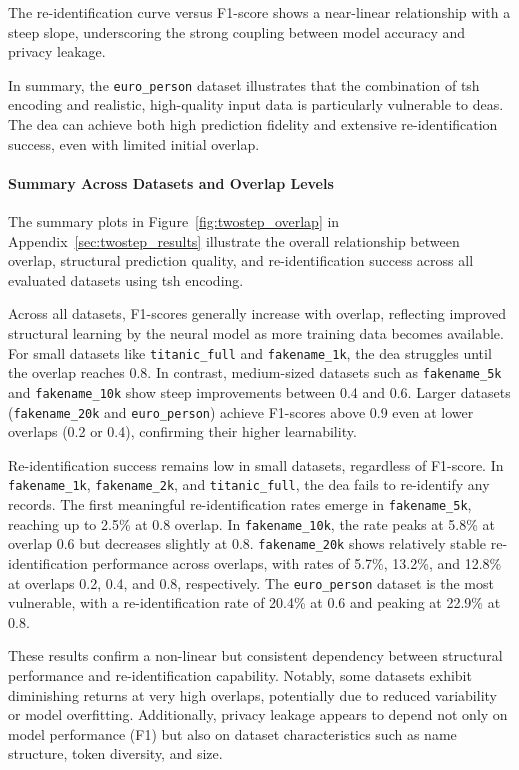 The re-identification curve versus F1-score shows a near-linear relationship with a steep slope, underscoring the strong coupling between model accuracy and privacy leakage.

In summary, the \texttt{euro\_person} dataset illustrates that the combination of \ac{tsh} encoding and realistic, high-quality input data is particularly vulnerable to \ac{dea}s.
The \ac{dea} can achieve both high prediction fidelity and extensive re-identification success, even with limited initial overlap.

\paragraph{Summary Across Datasets and Overlap Levels}

The summary plots in Figure~\ref{fig:twostep_overlap} in Appendix~\ref{sec:twostep_results} illustrate the overall relationship between overlap, structural prediction quality, and re-identification success across all evaluated datasets using \ac{tsh} encoding.

Across all datasets, F1-scores generally increase with overlap, reflecting improved structural learning by the neural model as more training data becomes available.
For small datasets like \texttt{titanic\_full} and \texttt{fakename\_1k}, the \ac{dea} struggles until the overlap reaches 0.8.
In contrast, medium-sized datasets such as \texttt{fakename\_5k} and \texttt{fakename\_10k} show steep improvements between 0.4 and 0.6.
Larger datasets (\texttt{fakename\_20k} and \texttt{euro\_person}) achieve F1-scores above 0.9 even at lower overlaps (0.2 or 0.4), confirming their higher learnability.

Re-identification success remains low in small datasets, regardless of F1-score.
In \texttt{fakename\_1k}, \texttt{fakename\_2k}, and \texttt{titanic\_full}, the \ac{dea} fails to re-identify any records.
The first meaningful re-identification rates emerge in \texttt{fakename\_5k}, reaching up to 2.5\% at 0.8 overlap.
In \texttt{fakename\_10k}, the rate peaks at 5.8\% at overlap 0.6 but decreases slightly at 0.8.
\texttt{fakename\_20k} shows relatively stable re-identification performance across overlaps, with rates of 5.7\%, 13.2\%, and 12.8\% at overlaps 0.2, 0.4, and 0.8, respectively.
The \texttt{euro\_person} dataset is the most vulnerable, with a re-identification rate of 20.4\% at 0.6 and peaking at 22.9\% at 0.8.

These results confirm a non-linear but consistent dependency between structural performance and re-identification capability.
Notably, some datasets exhibit diminishing returns at very high overlaps, potentially due to reduced variability or model overfitting.
Additionally, privacy leakage appears to depend not only on model performance (F1) but also on dataset characteristics such as name structure, token diversity, and size.


